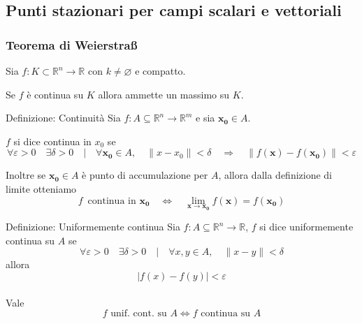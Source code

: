 \documentclass[x11names]{article}
\begin{document}
	\subsection{Punti stazionari per campi scalari e vettoriali}
	\begin{center}
		\colorbox{myred}{\begin{minipage}{5.75in}
				\begin{redes}{}
					\subsubsection{\textbf{Teorema di Weierstra{\ss}}}
					Sia \(f:K\subset \mathbb{R}^n \to \mathbb{R}\) con \(k\neq \varnothing\) e compatto.
					
					Se \(f\) è continua su \(K\) allora ammette un massimo su \(K\).
				\end{redes}
		\end{minipage}}
	\end{center}
	
	\begin{center}
		\colorbox{myblue}{\begin{minipage}{5.75in}
				\begin{blues}{Definizione: Continuità}
					Sia $f:A \subseteq\mathbb{R}^n\to \mathbb{R}^m$  e sia \(\boldsymbol{x_{0}} \in A\).
					
					\(f\) si dice continua in \(x_{0}\) se 
					\[ 
					\forall \varepsilon  > 0 \quad \exists \delta > 0 \quad | \quad \forall \boldsymbol{x_{0}} \in A, \quad \|x-x_{0}\| < \delta \quad \Longrightarrow \quad \|f(\boldsymbol{x}) - f(\boldsymbol{x_{0}})\| < \varepsilon
					\]
					
					Inoltre se \(\boldsymbol{x_{0}} \in A\) è punto di accumulazione per \(A\), allora dalla definizione di limite otteniamo 
					\[ 
					f \;\ \text{continua in } \boldsymbol{x_{0}} \quad \Longleftrightarrow \quad \lim_{\boldsymbol{x}\to \boldsymbol{x_{0}}} f(\boldsymbol{x}) = f(\boldsymbol{x_{0}})
					\]
				\end{blues}
		\end{minipage}}       
	\end{center}
	
	\begin{center}
		\colorbox{myblue}{\begin{minipage}{5.75in}
				\begin{blues}{Definizione: Uniformemente continua}
					Sia \(f:A\subseteq \mathbb{R}^n  \to \mathbb{R}\), \(f\) si dice uniformemente continua su \(A\) se
					\[ 
					\forall \varepsilon  > 0 \quad \exists \delta > 0 \quad | \quad \forall x,y \in A, \quad \|x-y\| < \delta
					\]
					allora 
					\[ 
					|f(x) - f(y)| < \varepsilon
					\] \\
					
					Vale 
					\[ 
					f \text{ unif. cont. su } A \Longleftrightarrow f \text{ continua su } A
					\]
				\end{blues}
		\end{minipage}}       
	\end{center}
	
\end{document}
